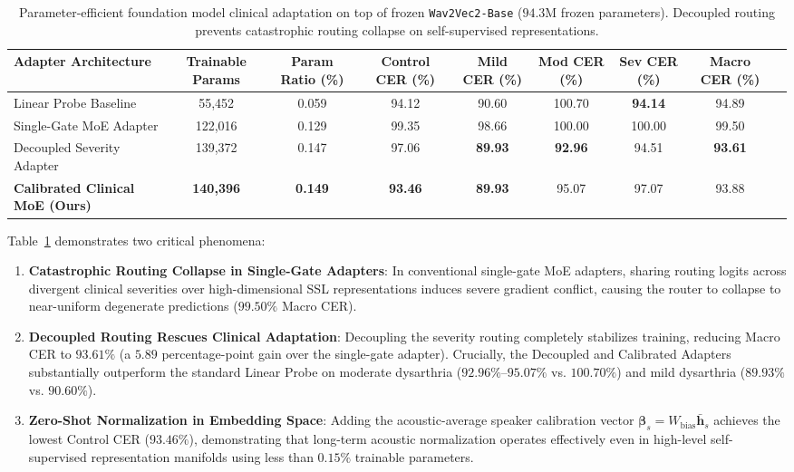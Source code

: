 \documentclass[10pt,twocolumn]{article}
\makeatletter
\newenvironment{adjustbox}[1]{%
  \begin{lrbox}{\@adjbox}%
}{%
  \end{lrbox}%
  \resizebox{\linewidth}{!}{\usebox{\@adjbox}}%
}
\makeatother
\begin{document}
\begin{table}[!t]
\centering
\caption{Parameter-efficient foundation model clinical adaptation on top of frozen \texttt{Wav2Vec2-Base} ($94.3\text{M}$ frozen parameters). Decoupled routing prevents catastrophic routing collapse on self-supervised representations.}
\label{tab:foundation_benchmark}
\begin{adjustbox}{width=\textwidth}
\begin{tabular}{lcccccccc}
\toprule
\textbf{Adapter Architecture} & \textbf{Trainable Params} & \textbf{Param Ratio (\%)} & \textbf{Control CER (\%)} & \textbf{Mild CER (\%)} & \textbf{Mod CER (\%)} & \textbf{Sev CER (\%)} & \textbf{Macro CER (\%)} \\
\midrule
Linear Probe Baseline & 55,452 & 0.059 & 94.12 & 90.60 & 100.70 & \textbf{94.14} & 94.89 \\
Single-Gate MoE Adapter & 122,016 & 0.129 & 99.35 & 98.66 & 100.00 & 100.00 & 99.50 \\
Decoupled Severity Adapter & 139,372 & 0.147 & 97.06 & \textbf{89.93} & \textbf{92.96} & 94.51 & \textbf{93.61} \\
\textbf{Calibrated Clinical MoE (Ours)} & \textbf{140,396} & \textbf{0.149} & \textbf{93.46} & \textbf{89.93} & 95.07 & 97.07 & 93.88 \\
\bottomrule
\end{tabular}
\end{adjustbox}
\end{table}

Table~\ref{tab:foundation_benchmark} demonstrates two critical phenomena:
\begin{enumerate}
    \item \textbf{Catastrophic Routing Collapse in Single-Gate Adapters}: In conventional single-gate MoE adapters, sharing routing logits across divergent clinical severities over high-dimensional SSL representations induces severe gradient conflict, causing the router to collapse to near-uniform degenerate predictions ($99.50\%$ Macro CER).
    \item \textbf{Decoupled Routing Rescues Clinical Adaptation}: Decoupling the severity routing completely stabilizes training, reducing Macro CER to $93.61\%$ (a $5.89$ percentage-point gain over the single-gate adapter). Crucially, the Decoupled and Calibrated Adapters substantially outperform the standard Linear Probe on moderate dysarthria ($92.96\%\text{--}95.07\%$ vs. $100.70\%$) and mild dysarthria ($89.93\%$ vs. $90.60\%$).
    \item \textbf{Zero-Shot Normalization in Embedding Space}: Adding the acoustic-average speaker calibration vector $\bm{\beta}_s = W_{\text{bias}}\bar{\bm{h}}_s$ achieves the lowest Control CER ($93.46\%$), demonstrating that long-term acoustic normalization operates effectively even in high-level self-supervised representation manifolds using less than $0.15\%$ trainable parameters.
\end{enumerate}
\end{document}
